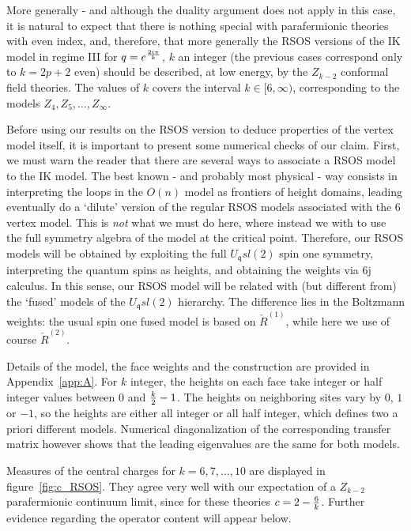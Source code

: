 \documentclass[11pt]{article}
\newcommand{\q}{\mathfrak{q}}
\begin{document}
More generally - and although the duality argument does not apply in this case, it is natural to expect that there is nothing special with parafermionic theories with even index, and, therefore, that more generally 
the RSOS versions of the IK model in regime III for $q=e^{2i\pi\over k}$, $k$ an integer (the previous cases correspond only  to $k=2p+2$ even) should be described, at low energy, by the $Z_{k-2}$ conformal field theories. The values of $k$ covers the interval $k\in [6,\infty)$, corresponding to the models $Z_4,Z_5,\ldots,Z_\infty$. 

Before using our results on the RSOS version to deduce properties of the vertex model itself, it is important to present 
some numerical checks of our claim. First, we must warn the reader that there are several ways to associate a RSOS model to the IK model. The best known - and probably most physical - way consists in interpreting the loops in the $O(n)$ model as frontiers of height domains, leading eventually do a `dilute' version of the regular RSOS models associated with the 6 vertex model. This is {\sl not} what we must do here, where instead we with to use the full symmetry algebra of the model at the critical point. Therefore, our RSOS models will be obtained by exploiting the full $U_{\q}sl(2)$ spin one symmetry, interpreting the  quantum spins as heights, and obtaining the weights via 6j calculus. In this sense, our RSOS model will be related with (but different from) the `fused' models \cite{Vincent} of the $U_{\q}sl(2)$ hierarchy. The difference lies in the Boltzmann weights: the usual spin one fused model is based on $\check{R}^{(1)}$, while here we use of course $\check{R}^{(2)}$. 

Details of the model, the  face weights and the construction are provided  in Appendix~\ref{app:A}.
For $k$ integer, the heights on each face take integer or half integer values between $0$ and ${k\over 2}-1$. The heights on neighboring sites vary by $0$, $1$ or $-1$, so the  heights are either all integer or all half integer, which defines two a priori different models. 
Numerical diagonalization of the corresponding transfer matrix however shows that the leading eigenvalues are the same for both models. 

Measures of the   central charges for $k=6, 7,\ldots,10$ are displayed in figure~\ref{fig:c_RSOS}. They  agree very well with our expectation of a $Z_{k-2}$ parafermionic continuum limit, since for these theories $c=2-{6\over k}$.  
Further evidence regarding the operator content will appear below. 
\end{document}
